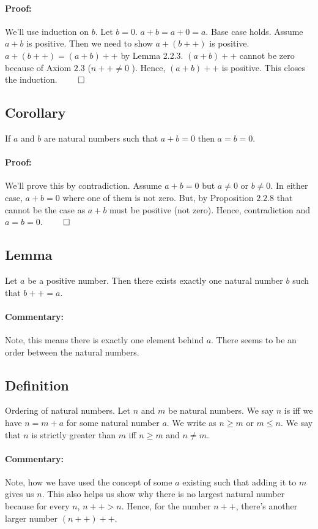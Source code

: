 \documentclass{report}
\begin{document}
 \paragraph{Proof: } We'll use induction on $b$. Let $b = 0$. $a + b = a + 0 =  a$. Base case holds. Assume $a+b$ is positive. Then we need to show $a+\left( b++ \right) $ is positive. $a + \left( b++ \right) = \left( a+b \right) ++$ by Lemma 2.2.3. $\left( a+b \right) ++ $ cannot be zero because of Axiom $2.3$ ($n++ \neq 0$ ). Hence, $\left( a+b \right) ++$ is positive. This closes the induction. $\qed$

 \subsection{Corollary} If $a$ and $b$ are natural numbers such that $a + b = 0$ then $a=b=0$.
\paragraph{Proof: } We'll prove this by contradiction. Assume $a+b = 0 $ but $a \neq 0$ or $b \neq 0$. In either case, $a+b=0$ where one of them is not zero. But, by Proposition $2.2.8$ that cannot be the case as $a+b$ must be positive (not zero). Hence, contradiction and $a = b= 0$.  $\qed$


\subsection{Lemma} Let  $a$ be a positive number. Then there exists exactly one natural number $b$ such that $b++ = a$.
\paragraph{Commentary: } Note, this means there is exactly one element behind $a$. There seems to be an order between the natural numbers.

\subsection{Definition} Ordering of natural numbers. Let $n$ and $m$ be natural numbers. We say $n$ is  iff we have  $n = m + a$ for some natural number $a$. We write  as $n\geq m $ or  $m \leq n$. We say that $n$ is strictly greater than $m$ iff $n \geq m$ and $n \neq m$. 

\paragraph{Commentary: }Note, how we have used the concept of some $a$ existing such that adding it to $m$ gives us $n$. This also helps us show why there is no largest natural number because for every $n$, $n++ > n$. Hence, for the number $n ++$, there's another larger number $\left( n++ \right) ++$. 
\end{document}
